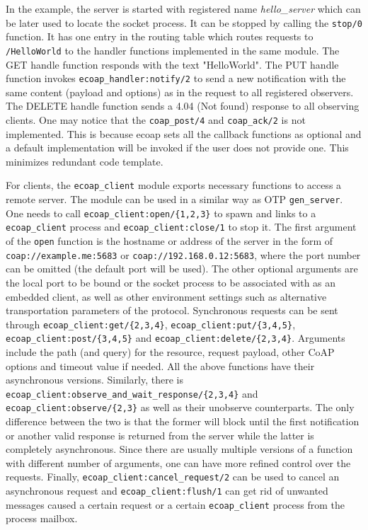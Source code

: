 In the example, the server is started with registered name \textit{hello\_server} which can be later used to locate the socket process. It can be stopped by calling the \verb|stop/0| function. It has one entry in the routing table which routes requests to \verb|/HelloWorld| to the handler functions implemented in the same module. The GET handle function responds with the text "HelloWorld". The PUT handle function invokes \verb|ecoap_handler:notify/2| to send a new notification with the same content (payload and options) as in the request to all registered observers. The DELETE handle function sends a 4.04 (Not found) response to all observing clients. One may notice that the \verb|coap_post/4| and \verb|coap_ack/2| is not implemented. This is because ecoap sets all the callback functions as optional and a default implementation will be invoked if the user does not provide one. This minimizes redundant code template.

For clients, the \verb|ecoap_client| module exports necessary functions to access a remote server. The module can be used in a similar way as OTP \verb|gen_server|. One needs to call \verb|ecoap_client:open/{1,2,3}| to spawn and links to a \verb|ecoap_client| process and \verb|ecoap_client:close/1| to stop it. The first argument of the \verb|open| function is the hostname or address of the server in the form of \verb|coap://example.me:5683| or \verb|coap://192.168.0.12:5683|, where the port number can be omitted (the default port will be used).
The other optional arguments are the local port to be bound or the socket process to be associated with as an embedded client, as well as other environment settings such as alternative transportation parameters of the protocol. Synchronous requests can be sent through \verb|ecoap_client:get/{2,3,4}|, \verb|ecoap_client:put/{3,4,5}|, \verb|ecoap_client:post/{3,4,5}| and \verb|ecoap_client:delete/{2,3,4}|. Arguments include the path (and query) for the resource, request payload, other CoAP options and timeout value if needed. All the above functions have their asynchronous versions. Similarly, there is \verb|ecoap_client:observe_and_wait_response/{2,3,4}|  and \verb|ecoap_client:observe/{2,3}| as well as their unobserve counterparts. The only difference between the two is that the former will block until the first notification or another valid response is returned from the server while the latter is completely asynchronous. Since there are usually multiple versions of a function with different number of arguments, one can have more refined control over the requests. Finally, \verb|ecoap_client:cancel_request/2| can be used to cancel an asynchronous request and \verb|ecoap_client:flush/1| can get rid of unwanted messages caused a certain request or a certain \verb|ecoap_client| process from the process mailbox. 


